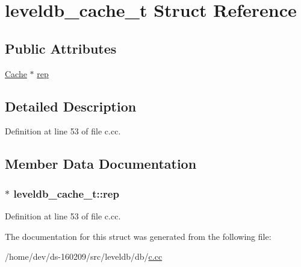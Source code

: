 \hypertarget{structleveldb__cache__t}{}\section{leveldb\+\_\+cache\+\_\+t Struct Reference}
\label{structleveldb__cache__t}
\subsection*{Public Attributes}
\begin{DoxyCompactItemize}
\item 
\hyperlink{classleveldb_1_1_cache}{Cache} $\ast$ \hyperlink{structleveldb__cache__t_a78f74e9a86ea86296e562fe990751a4a}{rep}
\end{DoxyCompactItemize}


\subsection{Detailed Description}


Definition at line 53 of file c.\+cc.



\subsection{Member Data Documentation}
\hypertarget{structleveldb__cache__t_a78f74e9a86ea86296e562fe990751a4a}{}
\subsubsection[{rep}]{$\ast$ leveldb\+\_\+cache\+\_\+t\+::rep}\label{structleveldb__cache__t_a78f74e9a86ea86296e562fe990751a4a}


Definition at line 53 of file c.\+cc.



The documentation for this struct was generated from the following file\+:\begin{DoxyCompactItemize}
\item 
/home/dev/ds-\/160209/src/leveldb/db/\hyperlink{c_8cc}{c.\+cc}\end{DoxyCompactItemize}
